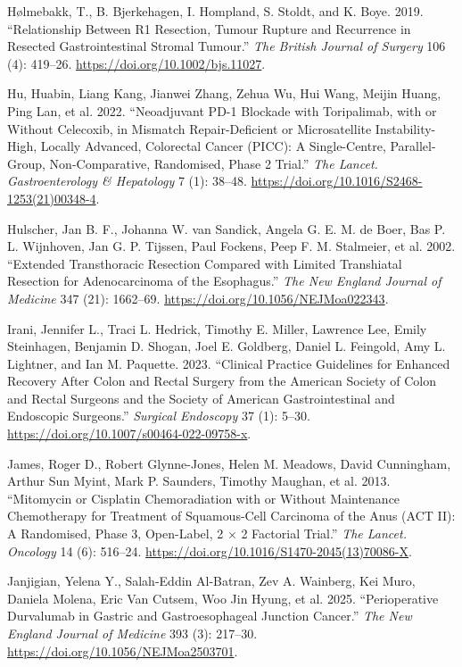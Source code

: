 \documentclass[
  letterpaper,
]{scrbook}
\newlength{\cslhangindent}
\newenvironment{CSLReferences}[2] %
 {\begin{list}{}{%
  \setlength{\itemindent}{0pt}
  \setlength{\leftmargin}{0pt}
  \setlength{\parsep}{0pt}
  \ifodd #1
   \setlength{\leftmargin}{\cslhangindent}
   \setlength{\itemindent}{-1\cslhangindent}
  \fi
  \setlength{\itemsep}{#2\baselineskip}}}
 {\end{list}}
\begin{document}
\begin{CSLReferences}{1}{0}
Hølmebakk, T., B. Bjerkehagen, I. Hompland, S. Stoldt, and K. Boye.
2019. {``Relationship Between {R1} Resection, Tumour Rupture and
Recurrence in Resected Gastrointestinal Stromal Tumour.''} \emph{The
British Journal of Surgery} 106 (4): 419--26.
\url{https://doi.org/10.1002/bjs.11027}.

Hu, Huabin, Liang Kang, Jianwei Zhang, Zehua Wu, Hui Wang, Meijin Huang,
Ping Lan, et al. 2022. {``Neoadjuvant {PD}-1 Blockade with Toripalimab,
with or Without Celecoxib, in Mismatch Repair-Deficient or
Microsatellite Instability-High, Locally Advanced, Colorectal Cancer
({PICC}): A Single-Centre, Parallel-Group, Non-Comparative, Randomised,
Phase 2 Trial.''} \emph{The Lancet. Gastroenterology \& Hepatology} 7
(1): 38--48. \url{https://doi.org/10.1016/S2468-1253(21)00348-4}.

Hulscher, Jan B. F., Johanna W. van Sandick, Angela G. E. M. de Boer,
Bas P. L. Wijnhoven, Jan G. P. Tijssen, Paul Fockens, Peep F. M.
Stalmeier, et al. 2002. {``Extended Transthoracic Resection Compared
with Limited Transhiatal Resection for Adenocarcinoma of the
Esophagus.''} \emph{The New England Journal of Medicine} 347 (21):
1662--69. \url{https://doi.org/10.1056/NEJMoa022343}.

Irani, Jennifer L., Traci L. Hedrick, Timothy E. Miller, Lawrence Lee,
Emily Steinhagen, Benjamin D. Shogan, Joel E. Goldberg, Daniel L.
Feingold, Amy L. Lightner, and Ian M. Paquette. 2023. {``Clinical
Practice Guidelines for Enhanced Recovery After Colon and Rectal Surgery
from the {American} {Society} of {Colon} and {Rectal} {Surgeons} and the
{Society} of {American} {Gastrointestinal} and {Endoscopic}
{Surgeons}.''} \emph{Surgical Endoscopy} 37 (1): 5--30.
\url{https://doi.org/10.1007/s00464-022-09758-x}.

James, Roger D., Robert Glynne-Jones, Helen M. Meadows, David
Cunningham, Arthur Sun Myint, Mark P. Saunders, Timothy Maughan, et al.
2013. {``Mitomycin or Cisplatin Chemoradiation with or Without
Maintenance Chemotherapy for Treatment of Squamous-Cell Carcinoma of the
Anus ({ACT} {II}): A Randomised, Phase 3, Open-Label, 2 × 2 Factorial
Trial.''} \emph{The Lancet. Oncology} 14 (6): 516--24.
\url{https://doi.org/10.1016/S1470-2045(13)70086-X}.

Janjigian, Yelena Y., Salah-Eddin Al-Batran, Zev A. Wainberg, Kei Muro,
Daniela Molena, Eric Van Cutsem, Woo Jin Hyung, et al. 2025.
{``Perioperative {Durvalumab} in {Gastric} and {Gastroesophageal}
{Junction} {Cancer}.''} \emph{The New England Journal of Medicine} 393
(3): 217--30. \url{https://doi.org/10.1056/NEJMoa2503701}.


\end{CSLReferences}
\end{document}
